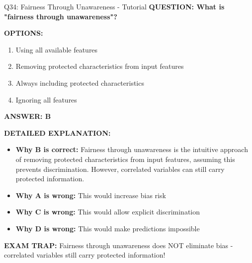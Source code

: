 \documentclass[8pt]{beamer}
\begin{document}
	\begin{frame}{Q34: Fairness Through Unawareness - Tutorial}
		\fontsize{6.5}{7.5}\selectfont
		\textbf{QUESTION: What is "fairness through unawareness"?}
		
		\vspace{0.1cm}
		\textbf{OPTIONS:}
		\begin{enumerate}
			\item Using all available features
			\item Removing protected characteristics from input features
			\item Always including protected characteristics
			\item Ignoring all features
		\end{enumerate}
		
		\vspace{0.1cm}
		\textcolor{myblue}{\textbf{ANSWER: B}}
		
		\vspace{0.1cm}
		\textbf{DETAILED EXPLANATION:}
		\begin{itemize}
			\item \textbf{Why B is correct:} Fairness through unawareness is the intuitive approach of removing protected characteristics from input features, assuming this prevents discrimination. However, correlated variables can still carry protected information.
			\item \textbf{Why A is wrong:} This would increase bias risk
			\item \textbf{Why C is wrong:} This would allow explicit discrimination
			\item \textbf{Why D is wrong:} This would make predictions impossible
		\end{itemize}
		
		\textcolor{myred}{\textbf{EXAM TRAP:}} Fairness through unawareness \textcolor{myblue}{does NOT eliminate bias} - correlated variables still carry protected information!
	\end{frame}
	
\end{document}
